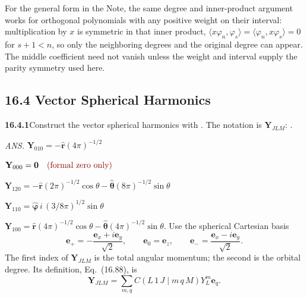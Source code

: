 For the general form in the Note, the same degree and inner-product
argument works for orthogonal polynomials with any positive weight on
their interval: multiplication
by $x$ is symmetric in that inner product,
$\langle x\varphi_n,\varphi_s\rangle=\langle\varphi_n,x\varphi_s\rangle
=0$ for $s+1<n$, so only the neighboring
degrees and the original degree can appear. The middle coefficient
need not vanish unless the weight and interval supply the parity
symmetry used here.

\subsection*{16.4 Vector Spherical Harmonics}

\par\bigskip
\noindent\textbf{16.4.1}\quad Construct the vector spherical
harmonics with . The notation is
$\mathbf Y_{JLM}$: .
\par\nobreak\hfill\emph{ANS.}\enspace
$\mathbf{Y}_{010}=-\hat{\mathbf{r}}(4\pi)^{-1/2}$\par\nobreak\hfill
$\mathbf{Y}_{000}=\mathbf{0}\quad\erratum{\text{(formal zero only)}}$\par\nobreak\hfill
$\mathbf{Y}_{120}=-\hat{\mathbf{r}}(2\pi)^{-1/2}\cos\theta
-\hat{\boldsymbol{\theta}}(8\pi)^{-1/2}\sin\theta$\par\nobreak\hfill
$\mathbf{Y}_{110}=\hat{\boldsymbol{\varphi}}\,
i\,(3/8\pi)^{1/2}\sin\theta$\par\nobreak\hfill
$\mathbf{Y}_{100}=\hat{\mathbf{r}}(4\pi)^{-1/2}\cos\theta
-\hat{\boldsymbol{\theta}}(4\pi)^{-1/2}\sin\theta$.
\solution
Use the spherical Cartesian basis
\[
\mathbf e_+=-\frac{\mathbf e_x+i\mathbf e_y}{\sqrt2},\qquad
\mathbf e_0=\mathbf e_z,\qquad
\mathbf e_-=\frac{\mathbf e_x-i\mathbf e_y}{\sqrt2}.
\]
The first index of $\mathbf Y_{JLM}$ is the total angular momentum;
the second is the orbital degree. Its definition, Eq.~(16.88), is
\[
\mathbf Y_{JLM}=\sum_{m,q}C(L\,1\,J\mid m\,q\,M)
Y_L^m\mathbf e_q.
\]

